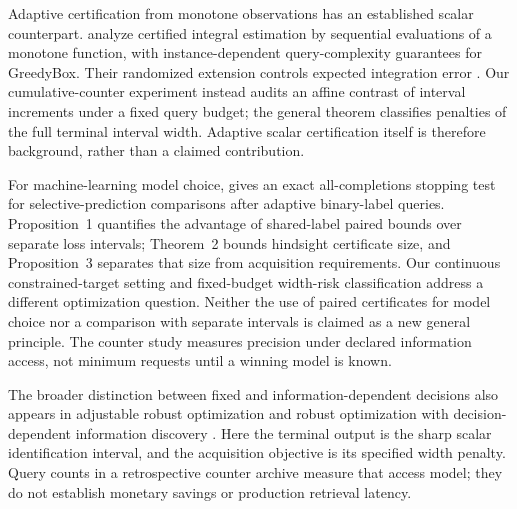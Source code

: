 Adaptive certification from monotone observations has an established scalar
counterpart. \citet[Section~4.1.1, Corollary~1 and Theorem~3]{gaillard2023}
analyze certified integral estimation by sequential evaluations of a monotone
function, with instance-dependent query-complexity guarantees for GreedyBox.
Their randomized extension controls expected integration error
\citep[Section~4.1.2, Theorem~4]{gaillard2023}.
Our cumulative-counter experiment instead audits an affine contrast of interval
increments under a fixed query budget; the general theorem classifies penalties
of the full terminal interval width. Adaptive scalar certification itself is
therefore background, rather than a claimed contribution.

For machine-learning model choice, \citet[Theorem~1]{kuboyama2026} gives an exact
all-completions stopping test for selective-prediction comparisons after adaptive
binary-label queries. Proposition~1 quantifies the advantage of shared-label
paired bounds over separate loss intervals; Theorem~2 bounds hindsight certificate
size, and Proposition~3 separates that size from acquisition requirements.
Our continuous constrained-target setting and fixed-budget width-risk
classification address a different optimization question. Neither the use of
paired certificates for model choice nor a comparison with separate intervals is
claimed as a new general principle. The counter study measures precision under
declared information access, not minimum requests until a winning model is known.

The broader distinction between fixed and information-dependent decisions also
appears in adjustable robust optimization \citep{wei2024} and robust optimization
with decision-dependent information discovery \citep{ddid}. Here the terminal
output is the sharp scalar identification interval, and the acquisition objective
is its specified width penalty. Query counts in a retrospective counter archive
measure that access model; they do not establish monetary savings or production
retrieval latency.

